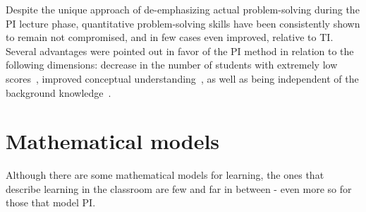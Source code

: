 \documentclass[twocolumn,secnumarabic,amssymb, nobibnotes, aps, prd]{revtex4-2}
\begin{document}
    Despite the unique approach of de-emphasizing actual problem-solving during the PI lecture phase, quantitative problem-solving skills have been consistently shown to remain not compromised, and in few cases even improved, relative to TI.
    Several advantages were pointed out in favor of the PI method in relation to the following dimensions: decrease in the number of students with extremely low scores~\cite{crouch2001peer,lasry2008peer,thacker1994comparing}, improved conceptual understanding~\cite{crouch2001peer}, as well as being independent of the background knowledge~\cite{lasry2008peer,tobias1990they}.





\section{Mathematical models}

    Although there are some mathematical models for learning, the ones that describe learning in the classroom are few and far in between - even more so for those that model PI.
\end{document}
